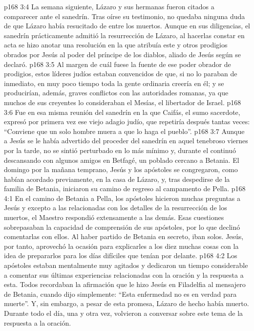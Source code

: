\vs p168 3:4 La semana siguiente, Lázaro y sus hermanas fueron citados a comparecer ante el sanedrín. Tras oírse su testimonio, no quedaba ninguna duda de que Lázaro había resucitado de entre los muertos. Aunque en sus diligencias, el sanedrín prácticamente admitió la resurrección de Lázaro, al hacerlas constar en acta se hizo anotar una resolución en la que atribuía este y otros prodigios obrados por Jesús al poder del príncipe de los diablos, aliado de Jesús según se declaró.
\vs p168 3:5 Al margen de cuál fuese la fuente de ese poder obrador de prodigios, estos líderes judíos estaban convencidos de que, si no lo paraban de inmediato, en muy poco tiempo toda la gente ordinaria creería en él; y se producirían, además, graves conflictos con las autoridades romanas, ya que muchos de sus creyentes lo consideraban el Mesías, el libertador de Israel.
\vs p168 3:6 Fue en esa misma reunión del sanedrín en la que Caifás, el sumo sacerdote, expresó por primera vez ese viejo adagio judío, que repetiría después tantas veces: “Conviene que un solo hombre muera a que lo haga el pueblo”.
\vs p168 3:7 Aunque a Jesús se le había advertido del proceder del sanedrín en aquel tenebroso viernes por la tarde, no se sintió perturbado en lo más mínimo y, durante el  continuó descansando con algunos amigos en Betfagé, un poblado cercano a Betania. El domingo por la mañana temprano, Jesús y los apóstoles se congregaron, como habían acordado previamente, en la casa de Lázaro, y, tras despedirse de la familia de Betania, iniciaron su camino de regreso al campamento de Pella.
\vs p168 4:1 En el camino de Betania a Pella, los apóstoles hicieron muchas preguntas a Jesús y excepto a las relacionadas con los detalles de la resurrección de los muertos, el Maestro respondió extensamente a las demás. Esas cuestiones sobrepasaban la capacidad de comprensión de sus apóstoles, por lo que declinó comentarlas con ellos. Al haber partido de Betania en secreto, iban solos. Jesús, por tanto, aprovechó la ocasión para explicarles a los diez muchas cosas con la idea de prepararlos para los días difíciles que tenían por delante.
\vs p168 4:2 Los apóstoles estaban mentalmente muy agitados y dedicaron un tiempo considerable a comentar sus últimas experiencias relacionadas con la oración y la respuesta a esta. Todos recordaban la afirmación que le hizo Jesús en Filadelfia al mensajero de Betania, cuando dijo simplemente: “Esta enfermedad no es en verdad para muerte”. Y, sin embargo, a pesar de esta promesa, Lázaro de hecho había muerto. Durante todo el día, una y otra vez, volvieron a conversar sobre este tema de la respuesta a la oración.
